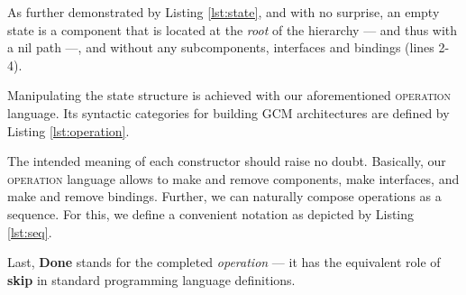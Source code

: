 	 As further demonstrated by Listing \ref{lst:state}, and with no surprise, 
	 an empty \textsf{state} is a \textsf{component} that is located at 
	the \textit{root} of the hierarchy --- and thus with a \textsf{nil path} ---, and without any 
	 sub\textsf{component}s, \textsf{interface}s and \textsf{binding}s (lines 2-4). 
	
	Manipulating  the \textsf{state} structure is achieved with our aforementioned 
	\textsc{operation} language. Its syntactic categories for building 
	\ac{GCM} architectures are defined by Listing \ref{lst:operation}.
	
	
		

	
	\noindent The intended meaning of each constructor should raise no doubt. Basically, 
	our \textsc{operation} language allows to make and remove components, make interfaces, and make and remove 
	bindings. Further, we can naturally compose \textsf{operation}s as a sequence. For this, we define a convenient
	notation as depicted by Listing \ref{lst:seq}.
	
		
	
	
		Last, \textbf{Done} stands for the completed \textit{operation} --- it has 
	the equivalent role of \textbf{skip} in standard programming language definitions.
	
